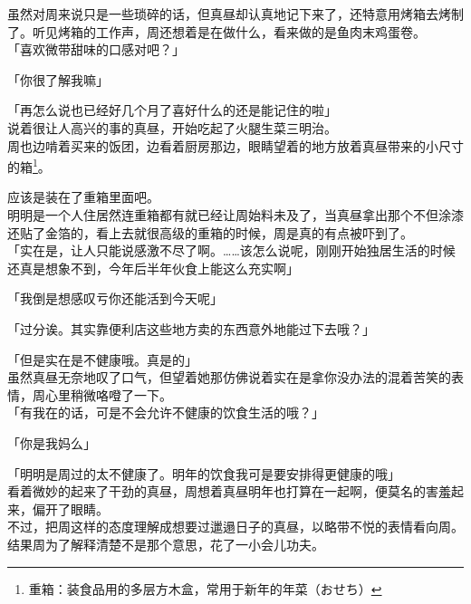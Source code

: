 虽然对周来说只是一些琐碎的话，但真昼却认真地记下来了，还特意用烤箱去烤制了。听见烤箱的工作声，周还想着是在做什么，看来做的是鱼肉末鸡蛋卷。\\

「喜欢微带甜味的口感对吧？」

「你很了解我嘛」

「再怎么说也已经好几个月了喜好什么的还是能记住的啦」\\

说着很让人高兴的事的真昼，开始吃起了火腿生菜三明治。\\

周也边啃着买来的饭团，边看着厨房那边，眼睛望着的地方放着真昼带来的小尺寸的箱\footnote{重箱：装食品用的多层方木盒，常用于新年的年菜（{\jpfont おせち}）}。

应该是装在了重箱里面吧。\\

明明是一个人住居然连重箱都有就已经让周始料未及了，当真昼拿出那个不但涂漆还贴了金箔的，看上去就很高级的重箱的时候，周是真的有点被吓到了。\\

「实在是，让人只能说感激不尽了啊。……该怎么说呢，刚刚开始独居生活的时候还真是想象不到，今年后半年伙食上能这么充实啊」

「我倒是想感叹亏你还能活到今天呢」

「过分诶。其实靠便利店这些地方卖的东西意外地能过下去哦？」

「但是实在是不健康哦。真是的」\\

虽然真昼无奈地叹了口气，但望着她那仿佛说着实在是拿你没办法的混着苦笑的表情，周心里稍微咯噔了一下。\\

「有我在的话，可是不会允许不健康的饮食生活的哦？」

「你是我妈么」

「明明是周过的太不健康了。明年的饮食我可是要安排得更健康的哦」\\

看着微妙的起来了干劲的真昼，周想着真昼明年也打算在一起啊，便莫名的害羞起来，偏开了眼睛。\\

不过，把周这样的态度理解成想要过邋遢日子的真昼，以略带不悦的表情看向周。结果周为了解释清楚不是那个意思，花了一小会儿功夫。\\
